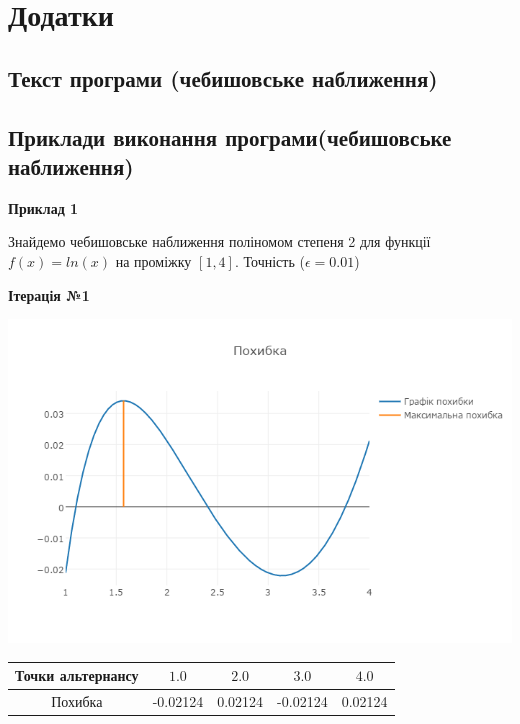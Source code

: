 \documentclass[ukrainian,14pt]{extarticle}
\begin{document}
\newpage

\section{Додатки}

\subsection{Текст програми (чебишовське наближення)}


\newpage

\subsection{Приклади виконання програми(чебишовське наближення)}
\textbf{Приклад 1} 	

Знайдемо чебишовське наближення поліномом степеня 2 для функції $f(x) = ln(x)$ на проміжку $[1, 4]$. Точність ($\epsilon = 0.01$)

\begin{center}
\textbf{Ітерація №1}
\end{center}

\includegraphics[scale=0.65]{log_err1}
\begin{tabular}{|c|c|c|c|c|}
\hline
\rule{0pt}{4ex}
Точки альтернансу & $1.0$ & $2.0$ & $3.0$ & $4.0$ \\ \hline
\rule{0pt}{4ex} 
Похибка & -0.02124 & 0.02124 & -0.02124 & 0.02124  \\ \hline 
\end{tabular}\\
\end{document}
